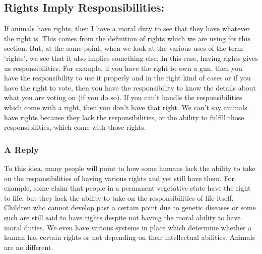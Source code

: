 \subsection{Rights Imply Responsibilities:}

If animals have rights, then I have a moral duty to see that they have whatever the right is. This comes from the definition of rights which we are using for this section. But, at the same point, when we look at the various uses of the term `rights', we see that it also implies something else. In this case, having rights gives us responsibilities. For example, if you have the right to own a gun, then you have the responsibility to use it properly and in the right kind of cases or if you have the right to vote, then you have the responsibility to know the details about what you are voting on (if you do so). If you can't handle the responsibilities which come with a right, then you don't have that right.  We can’t say animals have rights because they lack the responsibilities, or the ability to fulfill those responsibilities, which come with those rights. 
\subsubsection{A Reply}

To this idea, many people will point to how some humans lack the ability to take on the responsibilities of having various rights and yet still have them. For example, some claim that people in a permanent vegetative state have the right to life, but they lack the ability to take on the responsibilities of life itself. Children who cannot develop past a certain point due to genetic diseases or some such are still said to have rights despite not having the moral ability to have moral duties. We even have various systems in place which determine whether a human has certain rights or not depending on their intellectual abilities. Animals are no different. 

